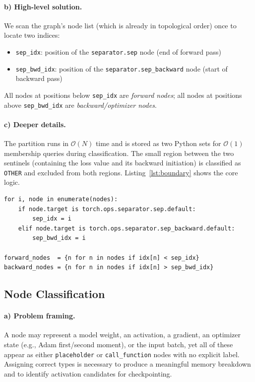 \documentclass[11pt]{article}
\begin{document}
\paragraph{b) High-level solution.}
We scan the graph's node list (which is already in topological order)
once to locate two indices:
\begin{itemize}
  \item \texttt{sep\_idx}: position of the \texttt{separator.sep} node
    (end of forward pass)
  \item \texttt{sep\_bwd\_idx}: position of the
    \texttt{separator.sep\_backward} node (start of backward pass)
\end{itemize}
All nodes at positions below \texttt{sep\_idx} are \emph{forward nodes};
all nodes at positions above \texttt{sep\_bwd\_idx} are
\emph{backward/optimizer nodes}.

\paragraph{c) Deeper details.}
The partition runs in $\mathcal{O}(N)$ time and is stored as two Python
sets for $\mathcal{O}(1)$ membership queries during classification.
The small region between the two sentinels (containing the loss value
and its backward initiation) is classified as \texttt{OTHER} and
excluded from both regions.
Listing~\ref{lst:boundary} shows the core logic.

\begin{lstlisting}[caption={Boundary detection (simplified)},
                   label={lst:boundary}]
for i, node in enumerate(nodes):
    if node.target is torch.ops.separator.sep.default:
        sep_idx = i
    elif node.target is torch.ops.separator.sep_backward.default:
        sep_bwd_idx = i

forward_nodes  = {n for n in nodes if idx[n] < sep_idx}
backward_nodes = {n for n in nodes if idx[n] > sep_bwd_idx}
\end{lstlisting}

\subsection{Node Classification}

\paragraph{a) Problem framing.}
A node may represent a model weight, an activation, a gradient, an
optimizer state (e.g., Adam first/second moment), or the input batch,
yet all of these appear as either \texttt{placeholder} or
\texttt{call\_function} nodes with no explicit label.
Assigning correct types is necessary to produce a meaningful memory
breakdown and to identify activation candidates for checkpointing.
\end{document}
